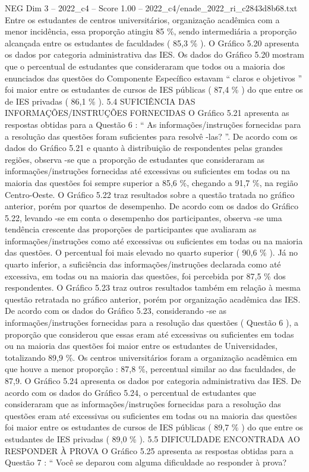 \begin{textsample}{NEG Dim 3 – 2022\_c4 – Score 1.00 – 2022\_c4/enade\_2022\_ri\_c2843d8b68.txt}
Entre os estudantes de centros universitários, organização acadêmica com a menor incidência, essa proporção atingiu 85 \%, sendo intermediária a proporção alcançada entre os estudantes de faculdades ( 85,3 \% ).
O Gráfico 5.20 apresenta os dados por categoria administrativa das IES.
Os dados do Gráfico 5.20 mostram que o percentual de estudantes que consideraram que todos ou a maioria dos enunciados das questões do Componente Específico estavam “ claros e objetivos ” foi maior entre os estudantes de cursos de IES públicas ( 87,4 \% ) do que entre os de IES privadas ( 86,1 \% ). 5.4 SUFICIÊNCIA DAS INFORMAÇÕES/INSTRUÇÕES FORNECIDAS O Gráfico 5.21 apresenta as respostas obtidas para a Questão 6 : “ As informações/instruções fornecidas para a resolução das questões foram suficientes para resolvê -las? ”.
De acordo com os dados do Gráfico 5.21 e quanto à distribuição de respondentes pelas grandes regiões, observa -se que a proporção de estudantes que consideraram as informações/instruções fornecidas até excessivas ou suficientes em todas ou na maioria das questões foi sempre superior a 85,6 \%, chegando a 91,7 \%, na região Centro-Oeste.
O Gráfico 5.22 traz resultados sobre a questão tratada no gráfico anterior, porém por quartos de desempenho.
De acordo com os dados do Gráfico 5.22, levando -se em conta o desempenho dos participantes, observa -se uma tendência crescente das proporções de participantes que avaliaram as informações/instruções como até excessivas ou suficientes em todas ou na maioria das questões.
O percentual foi mais elevado no quarto superior ( 90,6 \% ).
Já no quarto inferior, a suficiência das informações/instruções declarada como até excessiva, em todas ou na maioria das questões, foi percebida por 87,5 \% dos respondentes.
O Gráfico 5.23 traz outros resultados também em relação à mesma questão retratada no gráfico anterior, porém por organização acadêmica das IES.
De acordo com os dados do Gráfico 5.23, considerando -se as informações/instruções fornecidas para a resolução das questões ( Questão 6 ), a proporção que considerou que essas eram até excessivas ou suficientes em todas ou na maioria das questões foi maior entre os estudantes de Universidades, totalizando 89,9 \%.
Os centros universitários foram a organização acadêmica em que houve a menor proporção : 87,8 \%, percentual similar ao das faculdades, de 87,9.
O Gráfico 5.24 apresenta os dados por categoria administrativa das IES.
De acordo com os dados do Gráfico 5.24, o percentual de estudantes que consideraram que as informações/instruções fornecidas para a resolução das questões eram até excessivas ou suficientes em todas ou na maioria das questões foi maior entre os estudantes de cursos de IES públicas ( 89,7 \% ) do que entre os estudantes de IES privadas ( 89,0 \% ). 5.5 DIFICULDADE ENCONTRADA AO RESPONDER À PROVA O Gráfico 5.25 apresenta as respostas obtidas para a Questão 7 : “ Você se deparou com alguma dificuldade ao responder à prova?

\end{textsample}
